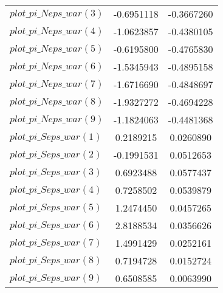 \begin{center}
\begin{longtable}{lcc}
$plot\_pi\_N eps\_war (3)   $	 & 	     -0.6951118	 & 	     -0.3667260 \\ 
$plot\_pi\_N eps\_war (4)   $	 & 	     -1.0623857	 & 	     -0.4380105 \\ 
$plot\_pi\_N eps\_war (5)   $	 & 	     -0.6195800	 & 	     -0.4765830 \\ 
$plot\_pi\_N eps\_war (6)   $	 & 	     -1.5345943	 & 	     -0.4895158 \\ 
$plot\_pi\_N eps\_war (7)   $	 & 	     -1.6716690	 & 	     -0.4848697 \\ 
$plot\_pi\_N eps\_war (8)   $	 & 	     -1.9327272	 & 	     -0.4694228 \\ 
$plot\_pi\_N eps\_war (9)   $	 & 	     -1.1824063	 & 	     -0.4481368 \\ 
$plot\_pi\_S eps\_war (1)   $	 & 	      0.2189215	 & 	      0.0260890 \\ 
$plot\_pi\_S eps\_war (2)   $	 & 	     -0.1991531	 & 	      0.0512653 \\ 
$plot\_pi\_S eps\_war (3)   $	 & 	      0.6923488	 & 	      0.0577437 \\ 
$plot\_pi\_S eps\_war (4)   $	 & 	      0.7258502	 & 	      0.0539879 \\ 
$plot\_pi\_S eps\_war (5)   $	 & 	      1.2474450	 & 	      0.0457265 \\ 
$plot\_pi\_S eps\_war (6)   $	 & 	      2.8188534	 & 	      0.0356626 \\ 
$plot\_pi\_S eps\_war (7)   $	 & 	      1.4991429	 & 	      0.0252161 \\ 
$plot\_pi\_S eps\_war (8)   $	 & 	      0.7194728	 & 	      0.0152724 \\ 
$plot\_pi\_S eps\_war (9)   $	 & 	      0.6508585	 & 	      0.0063990 \\ 
\end{longtable}
 \end{center}
